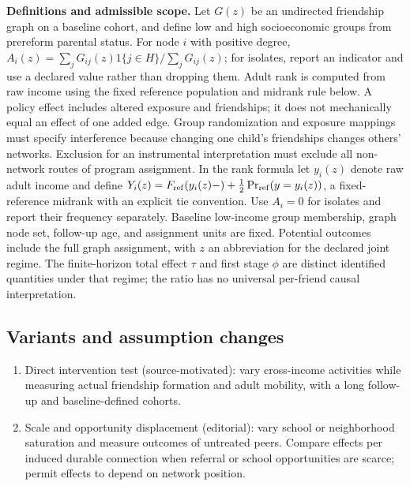 \documentclass[11pt,a4paper]{article}
\begin{document}
\textbf{Definitions and admissible scope.} Let \(G(z)\) be an undirected friendship graph on a baseline cohort, and define low and high socioeconomic groups from prereform parental status. For node \(i\) with positive degree, \(A_i(z)=\sum_jG_{ij}(z)1\{j\in H\}/\sum_jG_{ij}(z)\); for isolates, report an indicator and use a declared value rather than dropping them. Adult rank is computed from raw income using the fixed reference population and midrank rule below. A policy effect includes altered exposure and friendships; it does not mechanically equal an effect of one added edge. Group randomization and exposure mappings must specify interference because changing one child's friendships changes others' networks. Exclusion for an instrumental interpretation must exclude all non-network routes of program assignment. In the rank formula let \(y_i(z)\) denote raw adult income and define \(Y_i(z)=F_{\rm ref}(y_i(z)-)+\tfrac12\Pr_{\rm ref}(y=y_i(z))\), a fixed-reference midrank with an explicit tie convention. Use \(A_i=0\) for isolates and report their frequency separately. Baseline low-income group membership, graph node set, follow-up age, and assignment units are fixed. Potential outcomes include the full graph assignment, with \(z\) an abbreviation for the declared joint regime. The finite-horizon total effect \(\tau\) and first stage \(\phi\) are distinct identified quantities under that regime; the ratio has no universal per-friend causal interpretation.
\subsection*{Variants and assumption changes}
\begin{enumerate}
\item Direct intervention test (source-motivated): vary cross-income activities while measuring actual friendship formation and adult mobility, with a long follow-up and baseline-defined cohorts.
\item Scale and opportunity displacement (editorial): vary school or neighborhood saturation and measure outcomes of untreated peers. Compare effects per induced durable connection when referral or school opportunities are scarce; permit effects to depend on network position.
\end{enumerate}
\end{document}
